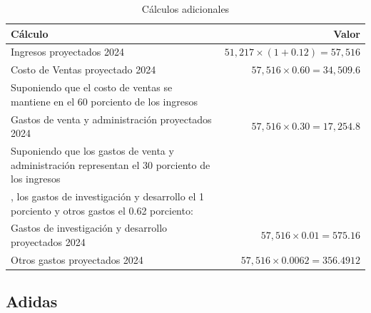 \documentclass[a4paper,12pt]{article}
\begin{document}
\clearpage
\newpage

\begin{landscape}
\begin{table}[h]
\centering
\caption{Cálculos adicionales}
\vspace{1cm}
\begin{tabular}{lr}
\toprule
\textbf{Cálculo} & \textbf{Valor} \\
\midrule
Ingresos proyectados 2024 & $51,217 \times (1 + 0.12) = 57,516$ \\
Costo de Ventas proyectado 2024 & $57,516 \times 0.60 = 34,509.6$ \\
Suponiendo que el costo de ventas se mantiene en el 60 porciento de los ingresos\\
Gastos de venta y administración proyectados 2024 & $57,516 \times 0.30 = 17,254.8$ \\
Suponiendo que los gastos de venta y administración representan el 30 porciento de los ingresos\\, los gastos de investigación y desarrollo el 1 porciento y otros gastos el 0.62 porciento:\\
Gastos de investigación y desarrollo proyectados 2024 & $57,516 \times 0.01 = 575.16$ \\
Otros gastos proyectados 2024 & $57,516 \times 0.0062 = 356.4912$ \\
\bottomrule
\end{tabular}
\end{table}
\end{landscape}


\clearpage

\newpage

\subsection{Adidas}
\end{document}
